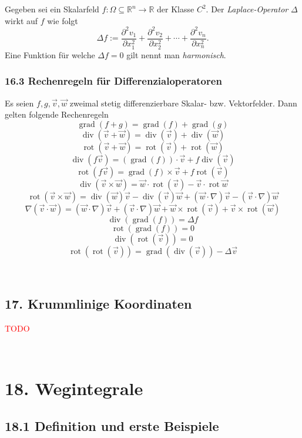\documentclass[a4paper,landscape,8pt]{extarticle}
\newcommand{\R}{\mathbb{R}}
\newcommand{\todo}{\textcolor{red}{TODO }}
\renewcommand\div{\operatorname{div}}
\DeclareMathOperator{\rot}{rot}
\newcommand{\laplace}{\Delta}
\DeclareMathOperator{\grad}{grad}
\renewcommand*{\newpage}{ \ }
\begin{document}
\begin{multicols*}{4}
\Def Gegeben sei ein Skalarfeld $f\colon\Omega\subseteq\R^n\to\R$ der Klasse
$C^2$.
Der \emph{Laplace-Operator} $\laplace$ wirkt auf $f$ wie folgt
\[
\laplace f := 
\frac{\partial^2 v_1}{\partial{x_1^2}} +
\frac{\partial^2 v_2}{\partial{x_2^2}} + \cdots +
\frac{\partial^2 v_n}{\partial{x_n^2}}.
\]
Eine Funktion für welche $\laplace f=0$ gilt nennt man \emph{harmonisch}.

\subsubsection{16.3 Rechenregeln für Differenzialoperatoren}

\Satz Es seien $f,g,\vec{v},\vec{w}$ zweimal stetig differenzierbare Skalar-
bzw. Vektorfelder. Dann gelten folgende Rechenregeln
\[
\grad(f+g) = \grad(f) + \grad(g)
\]
\[
\div(\vec{v}+\vec{w}) = \div(\vec{v}) + \div(\vec{w})
\]
\[
\rot(\vec{v}+\vec{w}) = \rot(\vec{v}) + \rot(\vec{w})
\]
\[
\div(f\vec{v}) = (\grad(f))\cdot\vec{v}+f\div(\vec{v})
\]
\[
\rot(f\vec{v}) = \grad(f)\times\vec{v} + f\rot(\vec{v})
\]
\[
\div(\vec{v}\times\vec{w}) = \vec{w}\cdot\rot(\vec{v}) -
\vec{v}\cdot\rot{\vec{w}}
\]
\[
\rot(\vec{v}\times\vec{w}) = \div(\vec{w})\vec{v} - \div(\vec{v})\vec{w} +
(\vec{w}\cdot\nabla)\vec{v} - (\vec{v}\cdot\nabla)\vec{w}
\]
\[
\nabla(\vec{v}\cdot\vec{w}) = (\vec{w}\cdot\nabla)\vec{v} +
(\vec{v}\cdot\nabla)\vec{w} + \vec{w}\times\rot(\vec{v}) +
\vec{v}\times\rot(\vec{w})
\]
\[
\div(\grad(f)) = \laplace f
\]
\[
\rot(\grad(f)) = 0
\]
\[
\div(\rot(\vec{v})) = 0
\]
\[
\rot(\rot(\vec{v})) = \grad(\div(\vec{v})) -\laplace\vec{v}
\]

\newpage


\begin{warmup}
\section{17. Krummlinige Koordinaten}

\todo

\newpage

\end{warmup}

\section{18. Wegintegrale}

\subsection{18.1 Definition und erste Beispiele}


\end{multicols*}
\end{document}
